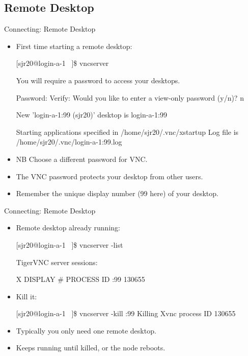 \subsection{Remote Desktop}
\begin{frame}[fragile]{Connecting: Remote Desktop}
\begin{itemize}
\item First time starting a remote desktop:
\begin{semiverbatim}
\footnotesize
[sjr20@login-a-1 ~]\$ vncserver

You will require a password to access your desktops.

Password: 
Verify:   
Would you like to enter a view-only password (y/n)? n

New 'login-a-1:99 (sjr20)' desktop is login-a-1:{\color{red}99}

Starting applications specified in /home/sjr20/.vnc/xstartup
Log file is /home/sjr20/.vnc/login-a-1:99.log
\end{semiverbatim}
\item{NB Choose a \alert{different} password for VNC.}
\item{The VNC password protects your desktop from other users.}
\item{Remember the unique display number ({\color{red}99} here) of your desktop.}
\end{itemize}
\end{frame}

\begin{frame}[fragile]{Connecting: Remote Desktop}
\begin{itemize}
\item Remote desktop already running:
\begin{semiverbatim}
\footnotesize
[sjr20@login-a-1 ~]\$ vncserver -list

TigerVNC server sessions:

X DISPLAY #     PROCESS ID
:99             130655
\end{semiverbatim}
\smallskip\item Kill it:
\begin{semiverbatim}
\footnotesize
[sjr20@login-a-1 ~]\$ vncserver -kill :99
Killing Xvnc process ID 130655
\end{semiverbatim}
\smallskip\item\alert{Typically you only need {\color{red}one} remote desktop.}
\item\alert{Keeps running until killed, or the node reboots.}
\end{itemize}
\end{frame}

